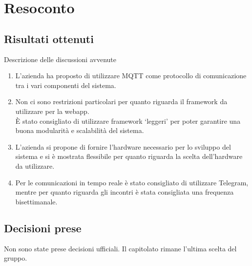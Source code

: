 \section{Resoconto}

\subsection{Risultati ottenuti}
Descrizione delle discussioni avvenute
\begin{enumerate}
    \item L'azienda ha proposto di utilizzare MQTT come protocollo di comunicazione tra i vari componenti del sistema. 
    \item Non ci sono restrizioni particolari per quanto riguarda il framework da utilizzare per la webapp. \\ È stato consigliato di utilizzare framework `leggeri' per poter garantire una buona modularità e scalabilità del sistema.
    \item L'azienda si propone di fornire l'hardware necessario per lo sviluppo del sistema e si è mostrata flessibile per quanto riguarda la scelta dell'hardware da utilizzare.
    \item Per le comunicazioni in tempo reale  è stato consigliato di utilizzare Telegram, mentre per quanto riguarda gli incontri è stata consigliata una frequenza bisettimanale.
\end{enumerate}

\subsection{Decisioni prese}
Non sono state prese decisioni ufficiali. Il capitolato rimane l'ultima scelta del gruppo.
